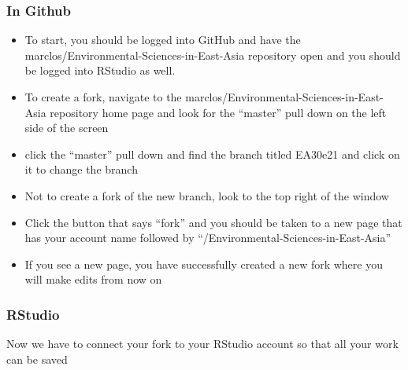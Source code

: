 \documentclass[12pt]{../SOP4_alpha}
\begin{document}
\subsubsection{In Github}
\begin{itemize}
\item To start, you should be logged into GitHub and have the marclos/Environmental-Sciences-in-East-Asia repository open and you should be logged into RStudio as well.

\item To create a fork, navigate to the marclos/Environmental-Sciences-in-East-Asia repository home page and look for the ``master'' pull down on the left side of the screen

\item click the ``master'' pull down and find the branch titled EA30e21 and click on it to change the branch

\item Not to create a fork of the new branch, look to the top right of the window

  \item Click the button that says ``fork'' and you should be taken to a new page that has your account name followed by ``/Environmental-Sciences-in-East-Asia''
  \item If you see a new page, you have successfully created a new fork where you will make edits from now on 
\end{itemize}


\subsubsection{RStudio}
Now we have to connect your fork to your RStudio account so that all your work can be saved 
\end{document}
